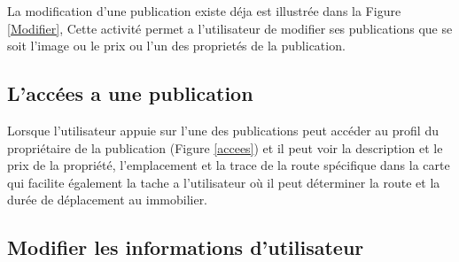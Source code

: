 \documentclass[french,a4,12pt]{report}
\begin{document}
La modification d'une publication existe déja est illustrée dans la Figure \ref{Modifier}, Cette activité permet a l'utilisateur de modifier ses publications que se soit l'image ou le prix ou l'un des proprietés de la publication.   
\newpage
%
\begin{tcolorbox}[colframe=green!75,rightrule=0.5cm,leftrule=0.5cm,]
	\centering
\subsection{L'accées a une publication }
\end{tcolorbox}

Lorsque l'utilisateur appuie sur l'une des publications peut accéder au profil du propriétaire de la publication (Figure \ref{accees}) et il peut voir la description et le prix de la propriété, l'emplacement et la trace de la route spécifique dans la carte qui facilite également la tache a l'utilisateur où il peut déterminer la route et la durée de déplacement au immobilier.
\newpage
\begin{tcolorbox}[colframe=green!75,rightrule=0.5cm,leftrule=0.5cm,]
	\centering
\subsection{Modifier les informations d'utilisateur }
\end{tcolorbox}
\end{document}
